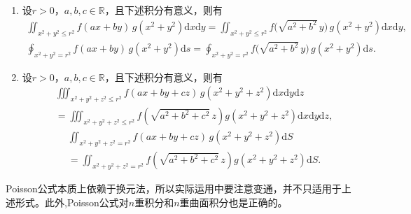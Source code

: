 \documentclass[../../main.tex]{subfiles}%
\begin{document}
\begin{corollary}[Poisson公式]\label{corollary:多元函数Poisson公式}
\begin{enumerate}[(1)]
\item 设$r>0$，$a,b,c\in\mathbb{R}$，且下述积分有意义，则有
\begin{gather*}
\iint_{x^2+y^2\leqslant r^2} f(ax+by)\,g(x^2+y^2)\mathrm{d}x\mathrm{d}y
=\iint_{x^2+y^2\leqslant r^2} f\bigl(\sqrt{a^2+b^2}\,y\bigr)\,g(x^2+y^2)\mathrm{d}x\mathrm{d}y,\\
\oint_{x^2+y^2=r^2} f(ax+by)\,g(x^2+y^2)\mathrm{d}s
=\oint_{x^2+y^2=r^2} f\bigl(\sqrt{a^2+b^2}\,y\bigr)\,g(x^2+y^2)\mathrm{d}s.
\end{gather*}

\item 设$r>0$，$a,b,c\in\mathbb{R}$，且下述积分有意义，则有
\begin{align*}
&\iiint_{x^2+y^2+z^2\leqslant r^2} f(ax+by+cz)\,g(x^2+y^2+z^2)\mathrm{d}x\mathrm{d}y\mathrm{d}z\\
&=\iiint_{x^2+y^2+z^2\leqslant r^2} f\left(\sqrt{a^2+b^2+c^2}\,z\right)g(x^2+y^2+z^2)\mathrm{d}x\mathrm{d}y\mathrm{d}z,
\end{align*}
\begin{align*}
&\iint_{x^2+y^2+z^2=r^2} f(ax+by+cz)\,g(x^2+y^2+z^2)\mathrm{d}S
\\
&=\iint_{x^2+y^2+z^2=r^2} f\left(\sqrt{a^2+b^2+c^2}\,z\right)g(x^2+y^2+z^2)\mathrm{d}S.
\end{align*}
\end{enumerate}
\end{corollary}
\begin{remark}
Poisson公式本质上依赖于换元法，所以实际运用中要注意变通，并不只适用于上述形式。此外,Poisson公式对$n$重积分和$n$重曲面积分也是正确的。
\end{remark}
\end{document}
